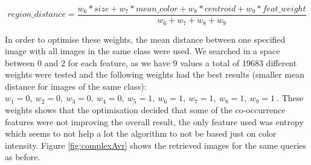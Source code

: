 \documentclass[12pt,a4paper]{article}
\begin{document}
\begin{equation}
region\_distance =  \frac{w_6 * size + w_7 * mean\_color + w_8 * centroid +  w_9 * feat\_weight}{w_6 + w_7 + w_8 + w_9}
\label{eq:complex_feat}
\end{equation}


In order to optimise these weights, the mean distance between one specified image with all images in the same class were used. We searched in a space between 0 and 2 for each feature, as we have 9 values a total of 19683 different weights were tested and the following weights had the best results (smaller mean distance for images of the same class): $w_1 = 0, \ w_2 = 0, \ w_3 = 0, \ w_4 = 0, \ w_5 = 1, \ w_6 = 1, \ w_7 = 1, \ w_8 = 1, \ w_9 = 1 \ $. These weights shows that the optimisation decided that some of the co-occurrence features were not improving the overall result, the only feature used was entropy which seems to not help a lot the algorithm to not be based just on color intensity. Figure \ref{fig:complexAvr} shows the retrieved images for the same queries as before. \\
\end{document}
